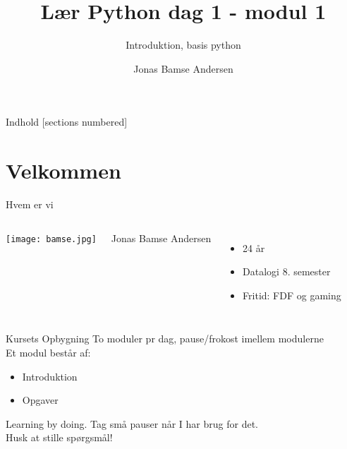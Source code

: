 \documentclass[10pt]{beamer}
\title{Lær Python dag 1 - modul 1}
\subtitle{Introduktion, basis python}
\date{}
\author{Jonas Bamse Andersen}
\institute{Syddansk Universitet}
\begin{document}
\maketitle

\begin{frame}{Indhold}
  [sections numbered]
  \tableofcontents[hideallsubsections]
\end{frame}

\section{Velkommen}

\begin{frame}[fragile]{Hvem er vi}
	\begin{columns}
			\begin{center}
				\texttt{[image: bamse.jpg]}
			\end{center}
			Jonas Bamse Andersen
			\begin{itemize}
				\item 24 år
				\item Datalogi 8. semester
				\item Fritid: FDF og gaming
			\end{itemize}
	\end{columns}
\end{frame}

\begin{frame}[fragile]{Kursets Opbygning}
	To moduler pr dag, pause/frokost imellem modulerne\\
	Et modul består af:
	\begin{itemize}
		\item Introduktion
		\item Opgaver
	\end{itemize}

	Learning by doing. Tag små pauser når I har brug for det.\\
	Husk at stille spørgsmål!
\end{frame}
\end{document}
